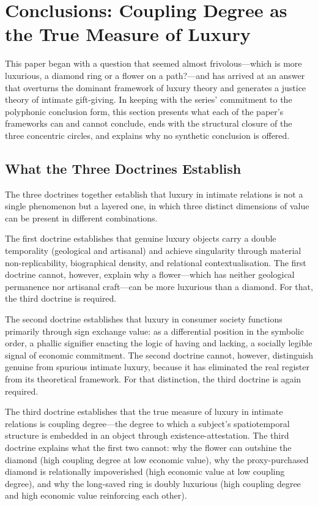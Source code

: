 \section{Conclusions: Coupling Degree as the True Measure of Luxury}
\label{p16:sec:conclusions}

\noindent
This paper began with a question that seemed almost frivolous---which is more luxurious, a diamond ring or a flower on a path?---and has arrived at an answer that overturns the dominant framework of luxury theory and generates a justice theory of intimate gift-giving. In keeping with the series' commitment to the polyphonic conclusion form, this section presents what each of the paper's frameworks can and cannot conclude, ends with the structural closure of the three concentric circles, and explains why no synthetic conclusion is offered.

\subsection{What the Three Doctrines Establish}
\label{p16:subsec:doctrines_establish}

\noindent
The three doctrines together establish that luxury in intimate relations is not a single phenomenon but a layered one, in which three distinct dimensions of value can be present in different combinations.

The first doctrine establishes that genuine luxury objects carry a double temporality (geological and artisanal) and achieve singularity through material non-replicability, biographical density, and relational contextualisation. The first doctrine cannot, however, explain why a flower---which has neither geological permanence nor artisanal craft---can be more luxurious than a diamond. For that, the third doctrine is required.

The second doctrine establishes that luxury in consumer society functions primarily through sign exchange value: as a differential position in the symbolic order, a phallic signifier enacting the logic of having and lacking, a socially legible signal of economic commitment. The second doctrine cannot, however, distinguish genuine from spurious intimate luxury, because it has eliminated the real register from its theoretical framework. For that distinction, the third doctrine is again required.

The third doctrine establishes that the true measure of luxury in intimate relations is coupling degree---the degree to which a subject's spatiotemporal structure is embedded in an object through existence-attestation. The third doctrine explains what the first two cannot: why the flower can outshine the diamond (high coupling degree at low economic value), why the proxy-purchased diamond is relationally impoverished (high economic value at low coupling degree), and why the long-saved ring is doubly luxurious (high coupling degree and high economic value reinforcing each other).

